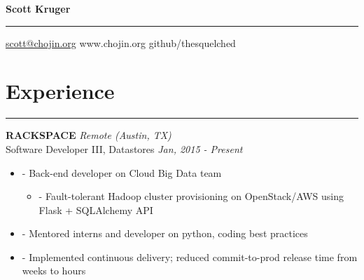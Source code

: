 \documentclass[a4paper,11pt]{article}
\newenvironment{pitemize}{
\begin{itemize}
\setlength{\itemsep}{.01in}
\setlength{\parskip}{.01in}
}
{\end{itemize}}
\begin{document}
\Huge{\textbf{Scott Kruger}}
\hrule
\vspace{0.05in}
\normalsize{
    \href{mailto:scott@chojin.org}{scott@chojin.org} 
    \hfill www.chojin.org \hfill github/thesquelched
}

\section*{\huge{Experience}}
\hrule
\vspace{0.1in}

\textbf{RACKSPACE} \hfill \textit{Remote (Austin, TX)} \\
Software Developer III, Datastores \hfill \textit{Jan, 2015 - Present}
\begin{pitemize}
    \item[-]Back-end developer on Cloud Big Data team
    \begin{pitemize}
        \item[-]Fault-tolerant Hadoop cluster provisioning on OpenStack/AWS using Flask + SQLAlchemy API
    \end{pitemize}
\item[-]Mentored interns and developer on python, coding best practices
\item[-]Implemented continuous delivery; reduced commit-to-prod release time from weeks to hours
\end{pitemize}
\end{document}
